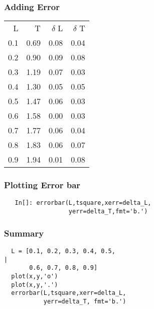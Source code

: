 \documentclass[presentation]{beamer}
\begin{document}
\begin{frame}
\frametitle{Adding Error}
\label{sec-4}




\begin{center}
\begin{tabular}{rrrr}
   L  &     T  &  $\delta$ L  &  $\delta$ T  \\
 0.1  &  0.69  &        0.08  &        0.04  \\
 0.2  &  0.90  &        0.09  &        0.08  \\
 0.3  &  1.19  &        0.07  &        0.03  \\
 0.4  &  1.30  &        0.05  &        0.05  \\
 0.5  &  1.47  &        0.06  &        0.03  \\
 0.6  &  1.58  &        0.00  &        0.03  \\
 0.7  &  1.77  &        0.06  &        0.04  \\
 0.8  &  1.83  &        0.06  &        0.07  \\
 0.9  &  1.94  &        0.01  &        0.08  \\
\end{tabular}
\end{center}


 
 
\end{frame}
\begin{frame}[fragile]
\frametitle{Plotting Error bar}
\label{sec-5}

  
\begin{verbatim}
   In[]: errorbar(L,tsquare,xerr=delta_L,
                  yerr=delta_T,fmt='b.')
\end{verbatim}

                  
\end{frame}
\begin{frame}[fragile]
\frametitle{Summary}
\label{sec-6}

\begin{verbatim}
  L = [0.1, 0.2, 0.3, 0.4, 0.5,                                             |
       0.6, 0.7, 0.8, 0.9]  
  plot(x,y,'o')
  plot(x,y,'.')
  errorbar(L,tsquare,xerr=delta_L, 
           yerr=delta_T, fmt='b.')    
\end{verbatim}
\end{frame}
\end{document}
